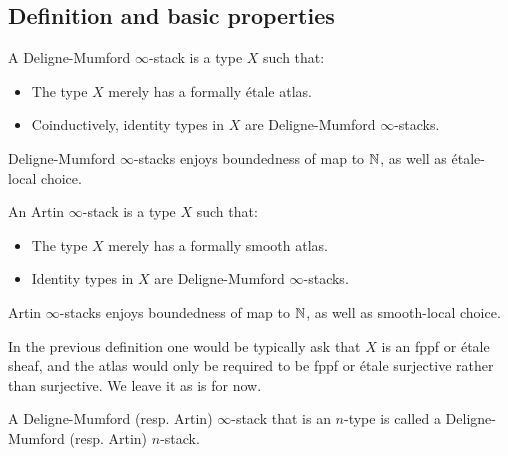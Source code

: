 \subsection{Definition and basic properties}

\begin{definition}
A Deligne-Mumford $\infty$-stack is a type $X$ such that:
\begin{itemize}
\item The type $X$ merely has a formally étale atlas. 
\item Coinductively, identity types in $X$ are Deligne-Mumford $\infty$-stacks.
\end{itemize}
\end{definition}

Deligne-Mumford $\infty$-stacks enjoys boundedness of map to $\mathbb{N}$, as well as étale-local choice.

\begin{definition}
An Artin $\infty$-stack is a type $X$ such that:
\begin{itemize}
\item The type $X$ merely has a formally smooth atlas. 
\item Identity types in $X$ are Deligne-Mumford $\infty$-stacks.
\end{itemize}
\end{definition}

Artin $\infty$-stacks enjoys boundedness of map to $\mathbb{N}$, as well as smooth-local choice.

\begin{remark}
In the previous definition one would be typically ask that $X$ is an fppf or étale sheaf, and the atlas would only be required to be fppf or étale surjective rather than surjective. We leave it as is for now.
\end{remark}

\begin{definition}
A Deligne-Mumford (resp. Artin) $\infty$-stack that is an $n$-type is called a Deligne-Mumford (resp. Artin) $n$-stack.
\end{definition}

